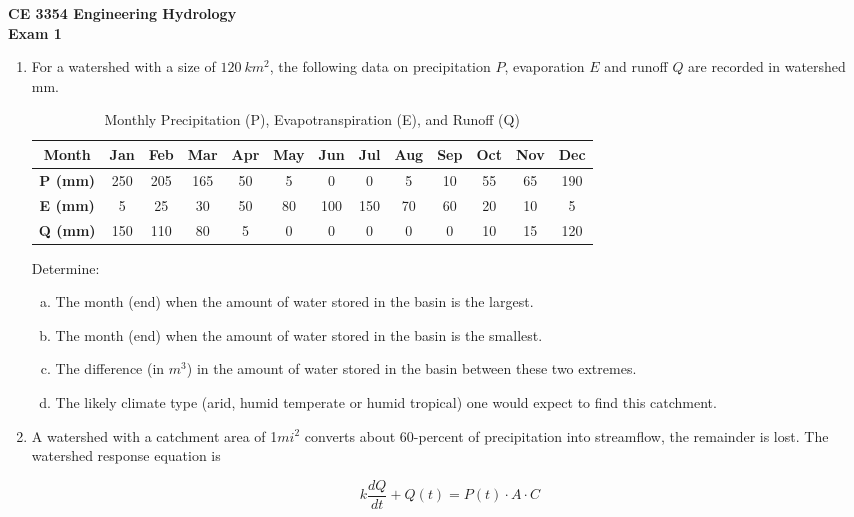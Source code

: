 \documentclass[12pt]{article}
\begin{document}
\begin{center}
{\textbf{{ CE 3354 Engineering Hydrology} \\ {Exam 1}}}
\end{center}


\begin{enumerate}

\item For a watershed with a size of $120~km^2$, the following data on precipitation $P$, evaporation
$E$ and runoff $Q$ are recorded in watershed mm.

\begin{table}[h!]
\centering
\caption{Monthly Precipitation (P), Evapotranspiration (E), and Runoff (Q)}
\begin{tabular}{|c|cccccccccccc|}
\hline
\textbf{Month} & Jan & Feb & Mar & Apr & May & Jun & Jul & Aug & Sep & Oct & Nov & Dec \\
\hline
\textbf{P (mm)} & 250 & 205 & 165 & 50 & 5 & 0 & 0 & 5 & 10 & 55 & 65 & 190 \\
\textbf{E (mm)} & 5 & 25 & 30 & 50 & 80 & 100 & 150 & 70 & 60 & 20 & 10 & 5 \\
\textbf{Q (mm)} & 150 & 110 & 80 & 5 & 0 & 0 & 0 & 0 & 0 & 10 & 15 & 120 \\
\hline
\end{tabular}
\end{table}

Determine:
    \begin{enumerate}[a)]
        \item The month (end) when the amount of water stored in the basin is the largest. 
        \item The month (end) when the amount of water stored in the basin is the smallest.
        \item The difference (in $m^3$) in the amount of water stored in the basin between these
two extremes.
        \item The likely climate type (arid, humid temperate or humid tropical) one would expect to find this
catchment.
    \end{enumerate}
\clearpage
\item A watershed with a catchment area of 1$mi^2$ converts about 60-percent of precipitation into streamflow, the remainder is lost.  The watershed response equation is 

\begin{equation}
 k\frac{dQ}{dt} + Q(t) = P(t) \cdot A \cdot C 
\end{equation}


\end{enumerate}
\end{document}

